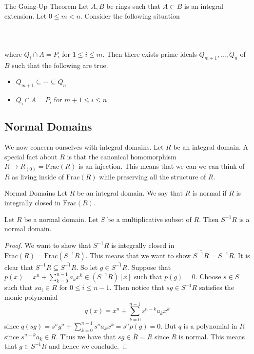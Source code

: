 \documentclass[a4paper]{article}
\begin{document}
\begin{thm}{The Going-Up Theorem}{} Let $A,B$ be rings such that $A\subset B$ is an integral extension. Let $0\leq m<n$. Consider the following situation \\~\\
\\~\\
where $Q_i\cap A=P_i$ for $1\leq i\leq m$. Then there exists prime ideals $Q_{m+1},\dots,Q_n$ of $B$ such that the following are true. 
\begin{itemize}
\item $Q_{m+1}\subseteq\cdots\subseteq Q_n$
\item $Q_i\cap A=P_i$ for $m+1\leq i\leq n$
\end{itemize}
\end{thm}

\subsection{Normal Domains}
We now concern ourselves with integral domains. Let $R$ be an integral domain. A special fact about $R$ is that the canonical homomorphism $R\to R_{(0)}=\text{Frac}(R)$ is an injection. This means that we can we can think of $R$ as living inside of $\text{Frac}(R)$ while preserving all the structure of $R$. 

\begin{defn}{Normal Domains}{} Let $R$ be an integral domain. We say that $R$ is normal if $R$ is integrally closed in $\text{Frac}(R)$. 
\end{defn}

\begin{prp}{}{} Let $R$ be a normal domain. Let $S$ be a multiplicative subset of $R$. Then $S^{-1}R$ is a normal domain. \tcbline
\begin{proof}
We want to show that $S^{-1}R$ is integrally closed in $\text{Frac}(R)=\text{Frac}(S^{-1}R)$. This means that we want to show $\overline{S^{-1}R}=S^{-1}R$. It is clear that $S^{-1}R\subseteq\overline{S^{-1}R}$. So let $g\in\overline{S^{-1}R}$. Suppose that $p(x)=x^n+\sum_{k=0}^{n-1}a_kx^k\in (S^{-1}R)[x]$ such that $p(g)=0$. Choose $s\in S$ such that $sa_i\in R$ for $0\leq i\leq n-1$. Then notice that $sg\in S^{-1}R$ satisfies the monic polynomial $$q(x)=x^n+\sum_{k=0}^{n-1}s^{n-k}a_kx^k$$ since $q(sg)=s^ng^n+\sum_{k=0}^{n-1}s^na_kx^k=s^np(g)=0$. But $q$ is a polynomial in $R$ since $s^{n-k}a_k\in R$. Thus we have that $sg\in\overline{R}=R$ since $R$ is normal. This means that $g\in S^{-1}R$ and hence we conclude. 
\end{proof}
\end{prp}
\end{document}
